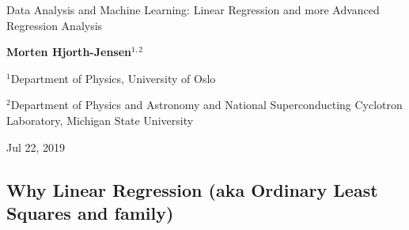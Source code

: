 \documentclass[%
oneside,                 %
final,                   %
10pt]{article}
\begin{document}

\newcommand{\exercisesection}[1]{\subsection*{#1}}






\thispagestyle{empty}

\begin{center}
{\LARGE\bf
\begin{spacing}{1.25}
Data Analysis and Machine Learning: Linear Regression and more Advanced Regression Analysis
\end{spacing}
}
\end{center}


\begin{center}
{\bf Morten Hjorth-Jensen${}^{1, 2}$} \\ [0mm]
\end{center}

\begin{center}
\centerline{{\small ${}^1$Department of Physics, University of Oslo}}
\centerline{{\small ${}^2$Department of Physics and Astronomy and National Superconducting Cyclotron Laboratory, Michigan State University}}
\end{center}
    

\begin{center}
Jul 22, 2019
\end{center}

\vspace{1cm}


\subsection*{Why Linear Regression (aka Ordinary Least Squares and family)}
\end{document}
